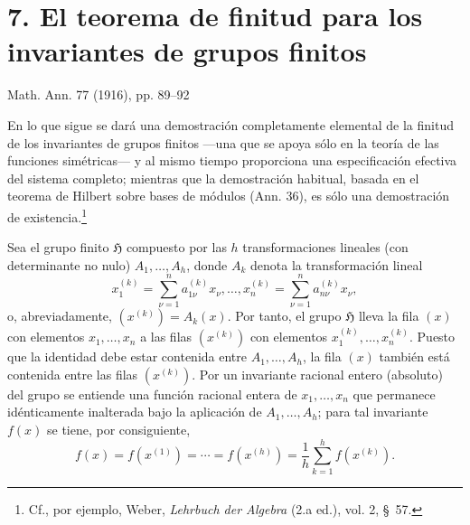 \documentclass[11pt]{article}
\providecommand{\Hgrp}{\mathfrak{H}}
\begin{document}
\section*{7. El teorema de finitud para los invariantes de grupos finitos}
\begin{center}
Math. Ann. 77 (1916), pp. 89--92
\end{center}

En lo que sigue se dará una demostración completamente elemental de la finitud de los invariantes de grupos finitos ---una que se apoya sólo en la teoría de las funciones simétricas--- y al mismo tiempo proporciona una especificación efectiva del sistema completo; mientras que la demostración habitual, basada en el teorema de Hilbert sobre bases de módulos (Ann. 36), es sólo una demostración de existencia.\footnote{Cf., por ejemplo, Weber, \emph{Lehrbuch der Algebra} (2.a ed.), vol. 2, \S\ 57.}

Sea el grupo finito $\Hgrp$ compuesto por las $h$ transformaciones lineales (con determinante no nulo) $A_1,\ldots,A_h$, donde $A_k$ denota la transformación lineal
\[
  x_1^{(k)}=\sum_{\nu=1}^{n}a_{1\nu}^{(k)}x_\nu,\ldots,
  x_n^{(k)}=\sum_{\nu=1}^{n}a_{n\nu}^{(k)}x_\nu,
\]
o, abreviadamente, $(x^{(k)})=A_k(x)$. Por tanto, el grupo $\Hgrp$ lleva la fila $(x)$ con elementos $x_1,
\ldots,x_n$ a las filas $(x^{(k)})$ con elementos $x_1^{(k)},
\ldots,x_n^{(k)}$. Puesto que la identidad debe estar contenida entre $A_1,
\ldots,A_h$, la fila $(x)$ también está contenida entre las filas $(x^{(k)})$. Por un invariante racional entero (absoluto) del grupo se entiende una función racional entera de $x_1,
\ldots,x_n$ que permanece idénticamente inalterada bajo la aplicación de $A_1,
\ldots,A_h$; para tal invariante $f(x)$ se tiene, por consiguiente,
\begin{equation}
  f(x)=f(x^{(1)})=\cdots=f(x^{(h)})=
  \frac1h\sum_{k=1}^{h}f(x^{(k)}).
\tag{1}
\end{equation}
\end{document}
